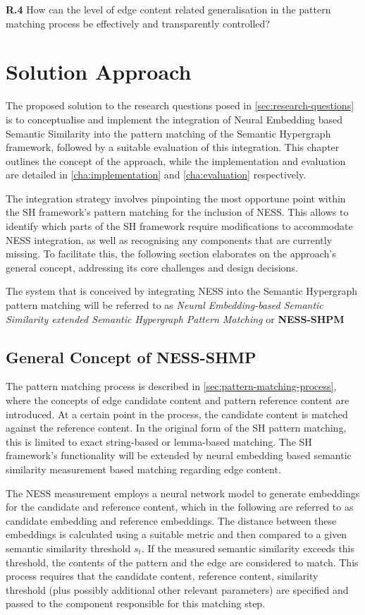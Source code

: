 \documentclass[11pt]{scrreprt}
\begin{document}
\textbf{R.4} How can the level of edge content related generalisation in the pattern matching process be effectively and transparently controlled?




\chapter{Solution Approach}
\label{cha:solution-approach}
The proposed solution to the research questions posed in \cref{sec:research-questions} is to conceptualise and implement the integration of Neural Embedding based Semantic Similarity into the pattern matching of the Semantic Hypergraph framework, followed by a suitable evaluation of this integration. This chapter outlines the concept of the approach, while the implementation and evaluation are detailed in \cref{cha:implementation} and \cref{cha:evaluation} respectively.

The integration strategy involves pinpointing the most opportune point within the SH framework's pattern matching for the inclusion of NESS. This  allows to identify which parts of the SH framework require modifications to accommodate NESS integration, as well as recognising any components that are currently missing. To facilitate this, the following section elaborates on the approach's general concept, addressing its core challenges and design decisions. 

The system that is conceived by integrating NESS into the Semantic Hypergraph pattern matching will be  referred to as \textit{Neural Embedding-based Semantic Similarity extended Semantic Hypergraph Pattern Matching} or {\textbf{NESS-SHPM}}

\section{General Concept of NESS-SHMP}
The pattern matching process is described in \cref{sec:pattern-matching-process}, where the concepts of edge candidate content and pattern reference content are introduced. At a certain point in the process, the candidate content is matched against the reference content. In the original form of the SH pattern matching, this is limited to exact string-based or lemma-based matching. The SH framework's functionality will be extended by neural embedding based semantic similarity measurement based matching regarding edge content.

The NESS measurement employs a neural network model to generate embeddings for the candidate and reference content, which in the following are referred to as candidate embedding and reference embeddings. The distance between these embeddings is calculated using a suitable metric and then compared to a given semantic similarity threshold \(s_t\). If the measured semantic similarity exceeds this threshold, the contents of the pattern and the edge are considered to match. This process requires that the candidate content, reference content, similarity threshold (plus possibly additional other relevant parameters) are specified and passed to the component responsible for this matching step.
\end{document}
